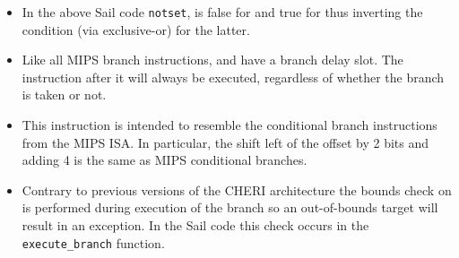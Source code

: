 \begin{itemize}
\item
In the above Sail code {\tt notset}, is false for  and true for  thus inverting the condition (via exclusive-or) for the latter.
\item
Like all MIPS branch instructions,  and
 have a branch delay slot.  The instruction after
it will always be executed, regardless of whether the branch is taken
or not.
\item
This instruction is intended to resemble the conditional branch instructions
from the MIPS ISA. In particular, the shift left of the offset by 2 bits and
adding 4 is the same as MIPS conditional branches.
\item
Contrary to previous versions of the CHERI architecture the bounds check on
\PCC{} is performed during execution of the branch so an out-of-bounds target
will result in an exception. In the Sail code this check occurs in the
\lstinline{execute_branch} function.
\end{itemize}
